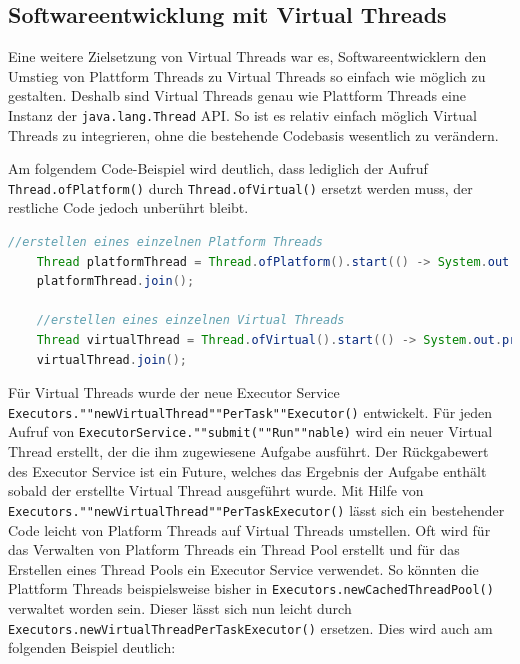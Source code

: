 \documentclass[fontsize=12pt,paper=a4,twoside=semi,parskip=half-,headsepline,headinclude]{scrreprt}
\newcommand{\code}[1]{\texttt{#1}}
\begin{document}
\subsection{Softwareentwicklung mit Virtual Threads}

Eine weitere Zielsetzung von Virtual Threads war es, Softwareentwicklern den Umstieg von Plattform Threads zu Virtual Threads so einfach wie möglich zu gestalten. Deshalb sind Virtual Threads genau wie Plattform Threads eine Instanz der \code{java.lang.Thread} API. So ist es relativ einfach möglich Virtual Threads zu integrieren, ohne die bestehende Codebasis wesentlich zu verändern.

Am folgendem Code-Beispiel wird deutlich, dass lediglich der Aufruf \code{Thread.ofPlatform()} durch \code{Thread.ofVirtual()} ersetzt werden muss, der restliche Code jedoch unberührt bleibt.

\begin{lstlisting}[language=Java]
	//erstellen eines einzelnen Platform Threads
	Thread platformThread = Thread.ofPlatform().start(() -> System.out.println("Platform Thread"));
	platformThread.join();

	//erstellen eines einzelnen Virtual Threads
	Thread virtualThread = Thread.ofVirtual().start(() -> System.out.println("Virtual Thread"));
	virtualThread.join();
\end{lstlisting}

Für Virtual Threads wurde der neue Executor Service \code{Executors.""newVirtualThread""PerTask""Executor()} entwickelt. Für jeden Aufruf von \texttt{ExecutorService.""submit(""Run""nable)} wird ein neuer Virtual Thread erstellt, der die ihm zugewiesene Aufgabe ausführt. Der Rückgabewert des Executor Service ist ein Future, welches das Ergebnis der Aufgabe enthält sobald der erstellte Virtual Thread ausgeführt wurde. Mit Hilfe von \code{Executors.""newVirtualThread""PerTaskExecutor()} lässt sich ein bestehender Code leicht von Platform Threads auf Virtual Threads umstellen. Oft wird für das Verwalten von Platform Threads ein Thread Pool erstellt und für das Erstellen eines Thread Pools ein Executor Service verwendet. So könnten die Plattform Threads beispielsweise bisher in \code{Executors.newCachedThreadPool()} verwaltet worden sein. Dieser lässt sich nun leicht durch \code{Executors.newVirtualThreadPerTaskExecutor()} ersetzen. Dies wird auch am folgenden Beispiel deutlich:
\end{document}

